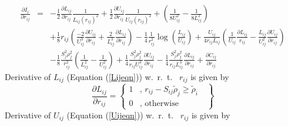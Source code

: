 \documentclass[12pt]{article}
\begin{document}
\begin{eqnarray}
\frac{\partial I_{i}}{\partial r_{ij}} & = & -\frac{1}{2}\frac{\partial L_{ij}}{\partial r_{ij}}\frac{1}{L_{ij}(r_{ij})^2} + 
  \frac{1}{2}\frac{\partial U_{ij}}{\partial r_{ij}}\frac{1}{U_{ij}(r_{ij})^2} + \left(\frac{1}{8 U_{ij}^2}-\frac{1}{8 L_{ij}^2}\right) \\ \nonumber
  & & + \frac{1}{8}r_{ij}
  \left(\frac{-2}{U_{ij}^{3}}\frac{\partial U_{ij}}{\partial r_{ij}}
  + \frac{2}{L_{ij}^{3}}\frac{\partial L_{ij}}{\partial r_{ij}}\right)
  -\frac{1}{4}\frac{1}{r_{ij}^{2}}\log\left({\frac{L_{ij}}{U_{ij}}}\right) +
  \frac{U_{ij}}{4r_{ij}L_{ij}}\left(\frac{1}{U_{ij}}\frac{\partial L_{ij}}{r_{ij}} - \frac{L_{ij}}{U_{ij}^2}\frac{\partial U_{ij}}{\partial r_{ij} } \right) \\ \nonumber
  & & -\frac{1}{8}
  \frac{S_{j}^{2} {\rho}_{j}^{2}}{r_{ij}^{2}}\left(\frac{1}{L_{ij}^{2}} - \frac{1}{U_{ij}^{2}} \right) +
  \frac{1}{4}\frac{S_{j}^{2}{\rho}_{j}^{2}}{r_{ij}U_{ij}^{3}}\frac{\partial U_{ij}}{\partial r_{ij}} 
  - \frac{1}{4}\frac{S_{j}^{2}{\rho}_{j}^{2}}{r_{ij}L_{ij}^{3}}\frac{\partial L_{ij}}{\partial r_{ij}}
  + \frac{\partial C_{ij}}{\partial r_{ij}}
\end{eqnarray}  
Derivative of $L_{ij}$ (Equation (\ref{Lijeqn})) w.~r.~t.~ $r_{ij}$ is given by
\begin{equation}
\frac{\partial L_{ij}}{\partial r_{ij}} = \left\{ \begin{array}{rl}
    1 &\mbox{, $r_{ij} - S_{ij}\tilde{\rho}_{j} {\geq} \tilde{\rho}_{i}$ } \\
    0 &\mbox{, otherwise} 
    \end{array} \right\}
\end{equation}
Derivative of $U_{ij}$ (Equation (\ref{Uijeqn})) w.~r.~t.~ $r_{ij}$ is given by
\end{document}
